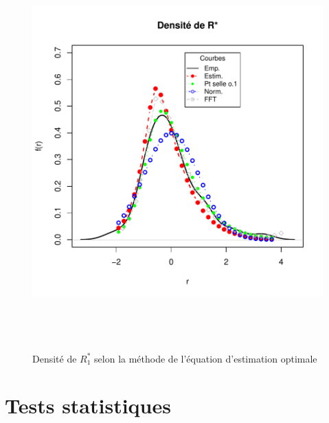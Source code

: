 \begin{figure}[!ht]
  \centering
  \includegraphics[height=6in,
  width=6in]{./graphiques/ABBEYN-densiteGALmu-5.pdf}
  \caption{Densité de $R_1^{*}$ selon la méthode de l'équation
    d'estimation optimale}
  \label{fig:densite3R1}
\end{figure}

\clearpage
\section{Tests statistiques}
\label{sec:tests-statistiques}

